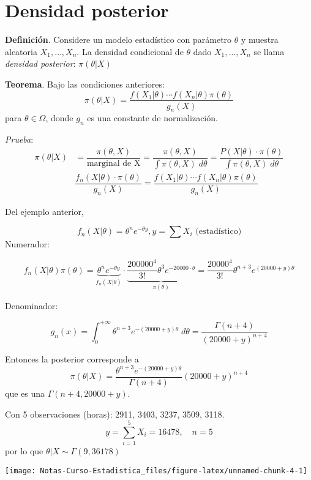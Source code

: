 \documentclass[
  12pt,
]{book}
\begin{document}
\hypertarget{densidad-posterior}{%
\section{Densidad posterior}\label{densidad-posterior}}

\textbf{Definición}. Considere un modelo estadístico con parámetro \(\theta\) y muestra aleatoria \(X_1,\dots, X_n\). La densidad condicional de \(\theta\) dado \(X_1,\dots,X_n\) se llama \emph{densidad posterior}: \(\pi(\theta|X)\)

\textbf{Teorema}. Bajo las condiciones anteriores:
\[\pi(\theta|X) = \dfrac{f(X_1|\theta)\cdots f(X_n|\theta)\pi(\theta)}{g_n(X)}\]
para \(\theta \in \Omega\), donde \(g_n\) es una constante de normalización.

\emph{Prueba}:
\begin{align*}
\pi(\theta|X) & = \dfrac{\pi(\theta,X)}{\text{marginal de X}} = \dfrac{\pi(\theta,X)}{\int \pi(\theta,X)\;d\theta}= \dfrac{P(X|\theta)\cdot \pi(\theta)}{\int \pi(\theta,X)\;d\theta}\\
& \dfrac{f_n(X|\theta)\cdot \pi(\theta)}{g_n(X)} = \dfrac{f(X_1|\theta)\cdots f(X_n|\theta)\pi(\theta)}{g_n(X)}
\end{align*}

Del ejemplo anterior,

\[f_n(X|\theta) = \theta^n e^{-\theta y}, y = \sum{X_i} \text{ (estadístico})\]
Numerador:

\[f_n(X|\theta)\pi(\theta) = \underbrace{\theta^n e^{-\theta y}}_{f_n(X|\theta)} \cdot \underbrace{\dfrac{200000^4}{3!}\theta^3e^{-20000\cdot\theta}}_{\pi(\theta)} = \dfrac{20000^4}{3!}\theta^{n+3}e^{(20000+y)\theta}\]

Denominador:

\[g_n(x) = \int_{0}^{+\infty}\theta^{n+3}e^{-(20000+y)\theta}\;d\theta = \dfrac{\Gamma(n+4)}{(20000+y)^{n+4}}\]

Entonces la posterior corresponde a
\[\pi(\theta|X) = \dfrac{\theta^{n+3}e^{-(20000+y)\theta}}{\Gamma(n+4)} (20000+y)^{n+4}\]
que es una \(\Gamma(n+4,20000+y)\).

Con 5 observaciones (horas): 2911, 3403, 3237, 3509, 3118.
\[y = \sum_{i=1}^{5}X_i = 16478, \quad n= 5\]
por lo que \(\theta|X \sim \Gamma(9,36178)\)

\begin{center}\texttt{[image: Notas-Curso-Estadistica\_files/figure-latex/unnamed-chunk-4-1]} \end{center}
\end{document}
